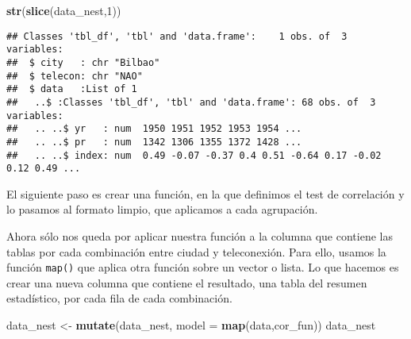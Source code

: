 \documentclass[]{article}
\newenvironment{Shaded}{\begin{snugshade}}{\end{snugshade}}
\newcommand{\KeywordTok}[1]{\textcolor[rgb]{0.13,0.29,0.53}{\textbf{#1}}}
\newcommand{\DataTypeTok}[1]{\textcolor[rgb]{0.13,0.29,0.53}{#1}}
\newcommand{\DecValTok}[1]{\textcolor[rgb]{0.00,0.00,0.81}{#1}}
\newcommand{\StringTok}[1]{\textcolor[rgb]{0.31,0.60,0.02}{#1}}
\newcommand{\ControlFlowTok}[1]{\textcolor[rgb]{0.13,0.29,0.53}{\textbf{#1}}}
\newcommand{\OperatorTok}[1]{\textcolor[rgb]{0.81,0.36,0.00}{\textbf{#1}}}
\newcommand{\NormalTok}[1]{#1}
\begin{document}
\begin{Shaded}
\begin{Highlighting}[]
\KeywordTok{str}\NormalTok{(}\KeywordTok{slice}\NormalTok{(data_nest,}\DecValTok{1}\NormalTok{))}
\end{Highlighting}
\end{Shaded}

\begin{verbatim}
## Classes 'tbl_df', 'tbl' and 'data.frame':    1 obs. of  3 variables:
##  $ city   : chr "Bilbao"
##  $ telecon: chr "NAO"
##  $ data   :List of 1
##   ..$ :Classes 'tbl_df', 'tbl' and 'data.frame': 68 obs. of  3 variables:
##   .. ..$ yr   : num  1950 1951 1952 1953 1954 ...
##   .. ..$ pr   : num  1342 1306 1355 1372 1428 ...
##   .. ..$ index: num  0.49 -0.07 -0.37 0.4 0.51 -0.64 0.17 -0.02 0.12 0.49 ...
\end{verbatim}

El siguiente paso es crear una función, en la que definimos el test de
correlación y lo pasamos al formato limpio, que aplicamos a cada
agrupación.

\begin{Shaded}
\end{Shaded}

Ahora sólo nos queda por aplicar nuestra función a la columna que
contiene las tablas por cada combinación entre ciudad y teleconexión.
Para ello, usamos la función \texttt{map()} que aplica otra función
sobre un vector o lista. Lo que hacemos es crear una nueva columna que
contiene el resultado, una tabla del resumen estadístico, por cada fila
de cada combinación.

\begin{Shaded}
\begin{Highlighting}[]
\NormalTok{data_nest <-}\StringTok{ }\KeywordTok{mutate}\NormalTok{(data_nest, }\DataTypeTok{model =} \KeywordTok{map}\NormalTok{(data,cor_fun))}
\NormalTok{data_nest}
\end{Highlighting}
\end{Shaded}
\end{document}
